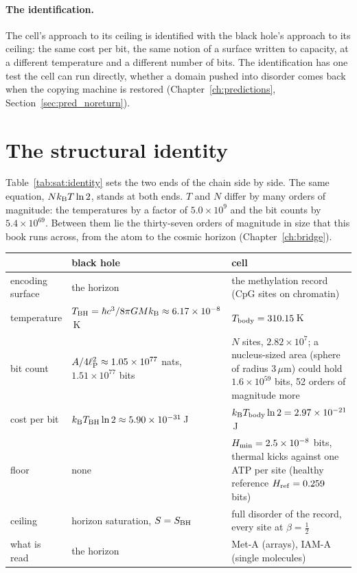 \paragraph{The identification.} The cell's approach to its ceiling is identified with the black hole's approach to its ceiling: the same
cost per bit, the same notion of a surface written to capacity, at a different temperature and a different number of bits. \conjecture The
identification has one test the cell can run directly, whether a domain pushed into disorder comes back when the copying machine is
restored (Chapter~\ref{ch:predictions}, Section~\ref{sec:pred_noreturn}). \prediction

\section{The structural identity}\label{app:sat:identity}
Table~\ref{tab:sat:identity} sets the two ends of the chain side by side.
The same equation, $Nk_{\mathrm B} T\ln2$, stands at both ends. $T$ and $N$ differ by many orders of magnitude: the temperatures by a factor of
$5.0\times10^{9}$ and the bit counts by $5.4\times10^{69}$. \calc{} Between them lie the thirty-seven orders of magnitude in size that this book
runs across, from the atom to the cosmic horizon (Chapter~\ref{ch:bridge}).

\begin{center}\small\begin{minipage}{\textwidth}\centering
{}\label{tab:sat:identity}
\begin{tabularx}{\textwidth}{@{}>{\raggedright\arraybackslash}p{}>{\raggedright\arraybackslash}X>{\raggedright\arraybackslash}X@{}}\toprule
 & black hole & cell \\\midrule
encoding surface & the horizon & the methylation record (CpG sites on chromatin) \\\rowrule
temperature & $T_{\rm BH}=\hbar c^3/8\pi GMk_{\mathrm B}\approx6.17\times10^{-8}$\,K & $T_{\mathrm{body}}=310.15$\,K \\\rowrule
bit count & $A/4\ell_{\mathrm P}^2\approx1.05\times10^{77}$ nats, $1.51\times10^{77}$ bits & $N$ sites, $2.82\times10^{7}$; a nucleus-sized area (sphere of radius 3\,$\mu$m) could hold $1.6\times10^{59}$ bits, 52 orders of magnitude more \\\rowrule
cost per bit & $k_{\mathrm B} T_{\rm BH}\ln2\approx5.90\times10^{-31}$\,J & $k_{\mathrm B}T_{\mathrm{body}}\ln2=2.97\times10^{-21}$\,J \\\rowrule
floor & none & $H_{\min}=2.5\times10^{-8}$ bits, thermal kicks against one ATP per site (healthy reference $H_{\rm ref}=0.259$ bits) \\\rowrule
ceiling & horizon saturation, $S=S_{\rm BH}$ & full disorder of the record, every site at $\beta=\tfrac12$ \\\rowrule
what is read & the horizon & Met-A (arrays), IAM-A (single molecules) \\\bottomrule
\end{tabularx}
\end{minipage}\end{center}

